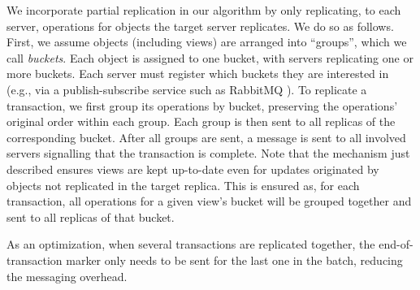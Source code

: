 We incorporate partial replication in our algorithm by only replicating, to each server, operations for objects the target server replicates.
We do so as follows.
First, we assume objects (including views) are arranged into ``groups'', which we call \emph{buckets}.
Each object is assigned to one bucket, with servers replicating one or more buckets.
Each server must register which buckets they are interested in (e.g., via a publish-subscribe service such as RabbitMQ \cite{rabbitmq}).
To replicate a transaction, we first group its operations by bucket, preserving the operations' original order within each group.
Each group is then sent to all replicas of the corresponding bucket.
After all groups are sent, a message is sent to all involved servers signalling that the transaction is complete.
Note that the mechanism just described ensures views are kept up-to-date even for updates originated by objects not replicated in the target replica.
This is ensured as, for each transaction, all operations for a given view's bucket will be grouped together and sent to all replicas of that bucket.

As an optimization, when several transactions are replicated together, the end-of-transaction marker only needs to be sent for the last one in the batch, reducing the messaging overhead.

